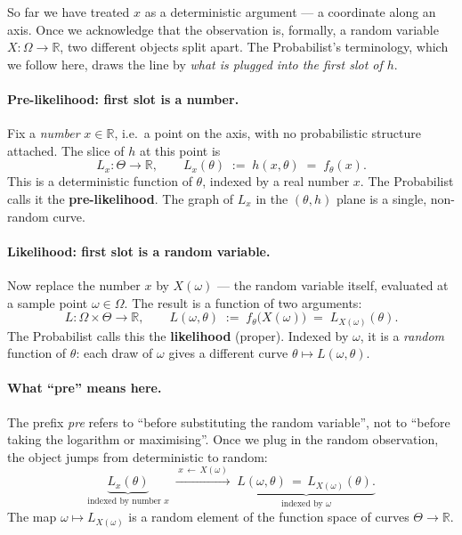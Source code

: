 \documentclass[a4paper,oneside,12pt]{extarticle}
\theoremstyle{plain}
\theoremstyle{definition}
\theoremstyle{remark}
\begin{document}
So far we have treated $x$ as a deterministic argument --- a coordinate
along an axis.  Once we acknowledge that the observation is, formally,
a random variable $X:\Omega\to\mathbb{R}$, two different objects split
apart.  The Probabilist's terminology, which we follow here, draws the line by
\emph{what is plugged into the first slot of $h$}.

\paragraph{Pre-likelihood: first slot is a number.}
Fix a \emph{number} $x \in \mathbb{R}$, i.e.\ a point on the axis,
with no probabilistic structure attached.  The slice of $h$ at this
point is
\[
  L_x : \Theta \to \mathbb{R},
  \qquad
  L_x(\theta) \;:=\; h(x,\theta) \;=\; f_\theta(x).
\]
This is a deterministic function of $\theta$, indexed by a real
number $x$.  The Probabilist calls it the \textbf{pre-likelihood}.  The graph
of $L_x$ in the $(\theta, h)$ plane is a single, non-random curve.

\paragraph{Likelihood: first slot is a random variable.}
Now replace the number $x$ by $X(\omega)$ --- the random variable
itself, evaluated at a sample point $\omega \in \Omega$.  The result
is a function of two arguments:
\[
  L : \Omega \times \Theta \to \mathbb{R},
  \qquad
  L(\omega, \theta) \;:=\; f_\theta\bigl(X(\omega)\bigr)
  \;=\; L_{X(\omega)}(\theta).
\]
The Probabilist calls this the \textbf{likelihood} (proper).  Indexed by
$\omega$, it is a \emph{random} function of $\theta$: each draw of
$\omega$ gives a different curve $\theta \mapsto L(\omega,\theta)$.

\paragraph{What ``pre'' means here.}
The prefix \emph{pre} refers to ``before substituting the random
variable'', not to ``before taking the logarithm or maximising''.
Once we plug in the random observation, the object jumps from
deterministic to random:
\[
  \underbrace{L_x(\theta)}_{\text{indexed by number } x}
  \;\xrightarrow{\;x \,\leftarrow\, X(\omega)\;}\;
  \underbrace{L(\omega,\theta) \,=\, L_{X(\omega)}(\theta).}_{\text{indexed by } \omega}
\]
The map $\omega \mapsto L_{X(\omega)}$ is a random element of the
function space of curves $\Theta \to \mathbb{R}$.
\end{document}
